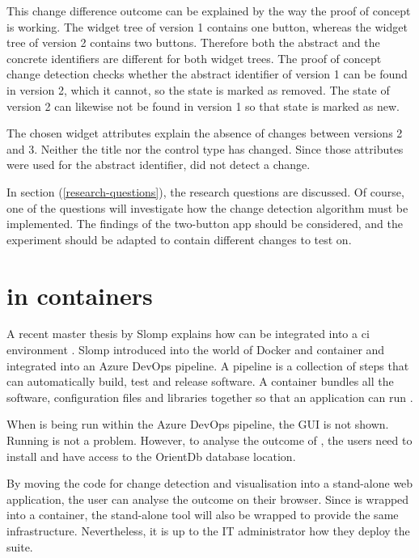 This change difference outcome can be explained by the way the proof of concept is working. The widget tree of version 1 contains one button, whereas the widget tree of version 2 contains two buttons. Therefore both the abstract and the concrete identifiers are different for both widget trees. The proof of concept change detection checks whether the abstract identifier of version 1 can be found in version 2, which it cannot, so the state is marked as removed. The state of version 2 can likewise not be found in version 1 so that state is marked as new.

The chosen widget attributes explain the absence of changes between versions 2 and 3. Neither the title nor the control type has changed. Since those attributes were used for the abstract identifier, \testar did not detect a change. 

In section (\ref{research-questions}), the research questions are discussed. Of course, one of the questions will investigate how the change detection algorithm must be implemented. The findings of the two-button app should be considered, and the experiment should be adapted to contain different changes to test on. 

\section{\testar in containers}\label{sec:testar-in-docker}
A recent master thesis by Slomp explains how \testar can be integrated into a \acrfull{ci} environment \cite{thesisSlomp}. Slomp introduced \testar into the world of Docker and container and integrated \testar into an Azure DevOps pipeline. A pipeline is a collection of steps that can automatically build, test and release software. A container bundles all the software, configuration files and libraries together so that an application can run \cite{ms-container}. 

When \testar is being run within the Azure DevOps pipeline, the \testar GUI is not shown. Running \testar is not a problem. However, to analyse the outcome of \testar, the users need to install \testar and have access to the OrientDb database location. 

By moving the code for change detection and visualisation into a stand-alone web application, the user can analyse the outcome on their browser. Since \testar is wrapped into a container, the stand-alone tool will also be wrapped to provide the same infrastructure. Nevertheless, it is up to the IT administrator how they deploy the \testar suite. 


